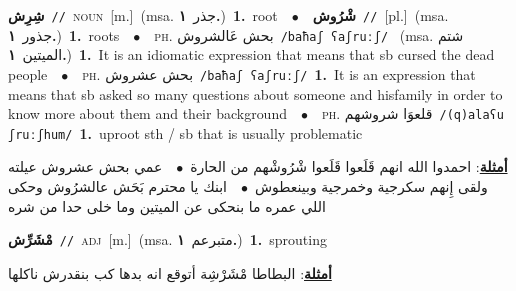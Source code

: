 \documentclass[10pt,a4paper,twoside]{article} %
\begin{document}
\begin{multicols}{2}
{\setlength\topsep{0pt}\textbf{\foreignlanguage{arabic}{شِرِش}}\ {\color{gray}\texttt{//}\color{black}}\ \textsc{noun}\ [m.]\ \color{gray}(msa. \foreignlanguage{arabic}{جذر}~\foreignlanguage{arabic}{\textbf{١.}})\color{black}\ \textbf{1.}~root\ \ $\bullet$\ \ \setlength\topsep{0pt}\textbf{\foreignlanguage{arabic}{شْرُوش}}\ {\color{gray}\texttt{//}\color{black}}\ [pl.]\ \color{gray}(msa. \foreignlanguage{arabic}{جذور}~\foreignlanguage{arabic}{\textbf{١.}})\color{black}\ \textbf{1.}~roots\ \ $\bullet$\ \ \textsc{ph.} \color{gray} \foreignlanguage{arabic}{بحش عَالشروش}\color{black}\ {\color{gray}\texttt{/{\sffamily baħaʃ ʕaʃruːʃ}/}\color{black}}\ \color{gray} (msa. \foreignlanguage{arabic}{شتم الميتين}~\foreignlanguage{arabic}{\textbf{١.}})\color{black}\ \textbf{1.}~It is an idiomatic expression that means that sb cursed the dead people\ \ $\bullet$\ \ \textsc{ph.} \color{gray} \foreignlanguage{arabic}{بحش عشروش}\color{black}\ {\color{gray}\texttt{/{\sffamily baħaʃ ʕaʃruːʃ}/}\color{black}}\ \textbf{1.}~It is an expression that means that sb asked so many questions about someone and hisfamily in order to know more about them and their background\ \ $\bullet$\ \ \textsc{ph.} \color{gray} \foreignlanguage{arabic}{قلعوَا شروشهم}\color{black}\ {\color{gray}\texttt{/{\sffamily (q)alaʕu ʃruːʃhum}/}\color{black}}\ \textbf{1.}~uproot sth / sb that is usually problematic\  \begin{flushright}\color{gray}\foreignlanguage{arabic}{\textbf{\underline{\foreignlanguage{arabic}{أمثلة}}}: احمدوا الله انهم قَلَعوا قَلَعوا شْرُوشْهم من الحارة\ $\bullet$\ \  عمي بحش عشروش عيلته ولقى إِنهم سكرجية وخمرجية وبينعطوش\ $\bullet$\ \  ابنك يا محترم بَحَش عالشرُوش وحكى اللي عمره ما بنحكى عن الميتين وما خلى حدا من شره}\end{flushright}\color{black}} \vspace{2mm}

{\setlength\topsep{0pt}\textbf{\foreignlanguage{arabic}{مْشَرِّش}}\ {\color{gray}\texttt{//}\color{black}}\ \textsc{adj}\ [m.]\ \color{gray}(msa. \foreignlanguage{arabic}{متبرعم}~\foreignlanguage{arabic}{\textbf{١.}})\color{black}\ \textbf{1.}~sprouting\  \begin{flushright}\color{gray}\foreignlanguage{arabic}{\textbf{\underline{\foreignlanguage{arabic}{أمثلة}}}: البطاطا مْشَرْشِة أتوقع انه بدها كب بنقدرش ناكلها}\end{flushright}\color{black}} \vspace{2mm}


\end{multicols}
\end{document}
